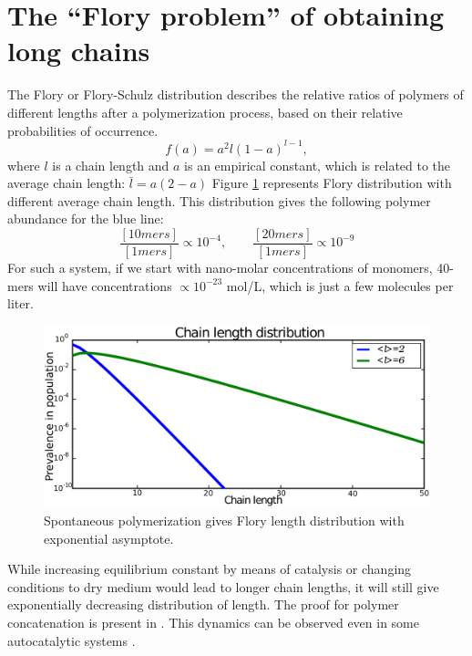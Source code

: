 \documentclass[journal=jacsat,manuscript=article,layout=twocolumn]{achemso}
\newcommand*{\pq}[1]{\left[ #1 \right]}
\begin{document}
\section{The ``Flory problem'' of obtaining long chains}
\label{sec:flory} 
The Flory or Flory-Schulz distribution describes the relative ratios of polymers of different 
lengths after a polymerization process, based on their relative probabilities of 
occurrence\cite{Flory1953}. 
\begin{equation}
 f(a)=a^2l(1-a)^{l-1},
\end{equation} 
where $l$ is a chain length and $a$ is an empirical 
constant, which is related to the average chain length: $\bar l = a(2- a)$
Figure \ref{fig:flory} represents Flory distribution  with different average chain length. 
This distribution gives the following polymer abundance for the blue line:
\begin{equation}
  \frac{\pq{10mers}}{\pq{1mers}}\propto10^{-4},\qquad\frac{\pq{20mers}}{\pq{1mers}}\propto10^{-9}
\end{equation} 
For such a system, if we start with nano-molar concentrations of monomers, 40-mers will have 
concentrations $\propto 10^{-23} $ mol/L, which is just a few molecules per liter. 
\begin{figure}[h!]
  \centering
  \includegraphics[width=\columnwidth]{pictures/flory2.pdf} 
  \caption{Spontaneous polymerization gives Flory length distribution with exponential asymptote.}
  \label{fig:flory}
\end{figure}

 While increasing equilibrium constant by means of catalysis or 
changing conditions to dry medium would lead to longer chain lengths, it will still give 
exponentially decreasing distribution of length. The proof for polymer concatenation is present 
in \cite{Derr2012}. This dynamics can be observed even in some autocatalytic systems \cite{Wu2009}.
\end{document}
